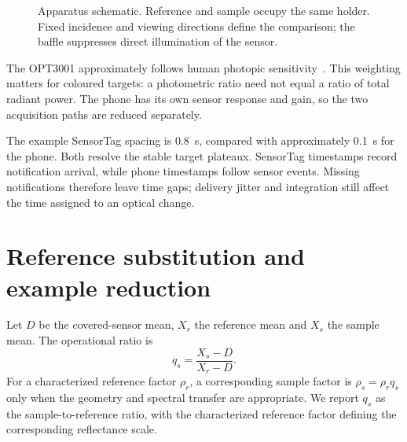 \begin{figure}[!htbp]
\centering
{}
\caption{Apparatus schematic. Reference and sample occupy the same holder. Fixed incidence and viewing directions define the comparison; the baffle suppresses direct illumination of the sensor.}
\label{fig:alb-apparatus}
\end{figure}

The OPT3001 approximately follows human photopic sensitivity~\cite{opt3001}. This weighting matters for coloured targets: a photometric ratio need not equal a ratio of total radiant power. The phone has its own sensor response and gain, so the two acquisition paths are reduced separately.

The example SensorTag spacing is 0.8~s, compared with approximately 0.1~s for the phone. Both resolve the stable target plateaux. SensorTag timestamps record notification arrival, while phone timestamps follow sensor events. Missing notifications therefore leave time gaps; delivery jitter and integration still affect the time assigned to an optical change.

\section{Reference substitution and example reduction}
Let $D$ be the covered-sensor mean, $X_r$ the reference mean and $X_s$ the sample mean. The operational ratio is
\begin{equation}
 q_s=\frac{X_s-D}{X_r-D}.
 \label{eq:alb-ratio}
\end{equation}
For a characterized reference factor $\rho_r$, a corresponding sample factor is $\rho_s=\rho_r q_s$ only when the geometry and spectral transfer are appropriate. We report $q_s$ as the sample-to-reference ratio, with the characterized reference factor defining the corresponding reflectance scale.

